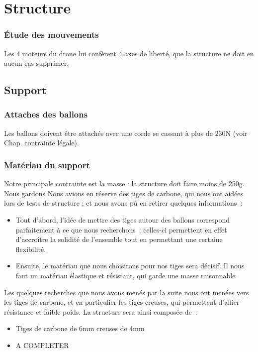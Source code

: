 \documentclass[a4paper,11pt]{article}
\begin{document}
\section{Structure}

\subsubsection{Étude des mouvements}

Les 4 moteurs du drone lui confèrent 4 axes de liberté, que la structure ne doit en aucun cas supprimer.

\subsection{Support}

\subsubsection{Attaches des ballons}

Les ballons doivent être attachés avec une corde se cassant à plus de 230N (voir Chap. contrainte légale).

\subsubsection{Matériau du support}
Notre principale contrainte est la masse : la structure doit faire moins de 250g. Nous gardons
Nous avions en réserve des tiges de carbone, qui nous ont aidées lors de tests de structure ; et nous avons pû en retirer quelques informations~:
\begin{itemize}
        \item Tout d'abord, l'idée de mettre des tiges autour des ballons correspond parfaitement à ce que nous recherchons~: celles-ci permettent en effet d'accroître la solidité de l'ensemble tout en permettant une certaine flexibilité.
        \item Ensuite, le matériau que nous choisirons pour nos tiges sera décisif. Il nous faut un matériau élastique et résistant, qui garde une masse raisonnable
\end{itemize}
Les quelques recherches que nous avons menés par la suite nous ont menées vers les tiges de carbone, et en particulier les tiges creuses, qui permettent d'allier résistance et faible poids.
La structure sera ainsi composée de~:
\begin{itemize}
        \item Tiges de carbone de 6mm creuses de 4mm
        \item A COMPLETER
\end{itemize}
\end{document}
